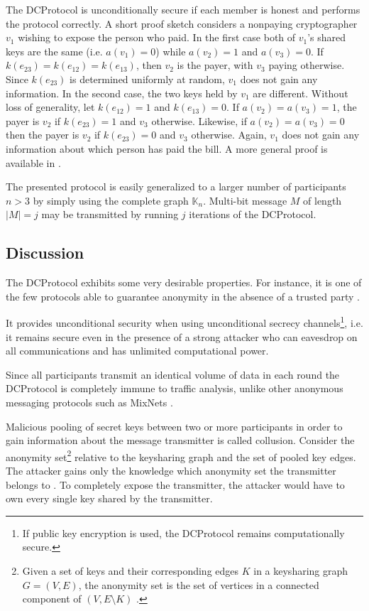 The \ac{DCProtocol} is unconditionally secure if each member is honest and performs the
protocol correctly. A short proof sketch considers a nonpaying cryptographer $v_1$
wishing to expose the person who paid. In the first case both of $v_1$'s shared keys are the same
(i.e. $a(v_1) = 0$) while $a(v_2) = 1$ and $a(v_3) = 0$. If $k(e_{23}) = k(e_{12}) = k(e_{13})$, then $v_2$
is the payer, with $v_3$ paying otherwise. Since $k(e_{23})$ is determined uniformly at random,
$v_1$ does not gain any information. In the second case, the two keys held by $v_1$ are different.
Without loss of generality, let $k(e_{12}) = 1$ and $k(e_{13}) = 0$.
If $a(v_2) = a(v_3) = 1$, the payer is $v_2$ if $k(e_{23}) = 1$ and $v_3$ otherwise.
Likewise, if $a(v_2) = a(v_3) = 0$ then the payer is $v_2$ if $k(e_{23}) = 0$ and $v_3$ otherwise.
Again, $v_1$ does not gain any information about which person has paid the bill.
A more general proof is available in \cite{journals/joc/Chaum88}.

The presented protocol is easily generalized to a larger number of participants $n > 3$ by simply
using the complete graph $\mathbb{K}_n$. Multi-bit message $M$ of length $|M| = j$
may be transmitted by running $j$ iterations of the \ac{DCProtocol}.  


\subsection{Discussion}

The \ac{DCProtocol} exhibits some very desirable properties. For instance, it is one of the few
protocols able to guarantee anonymity in the absence of a trusted party \cite{juels2004dining}.

It provides unconditional security when using unconditional secrecy channels\footnote{
If public key encryption is used, the \ac{DCProtocol} remains computationally secure.},
i.e. it remains secure even in the presence of a
strong attacker who can eavesdrop on all communications and has unlimited computational power.

Since all participants transmit an identical volume of data in each round the \ac{DCProtocol}
is completely immune to traffic analysis, unlike other anonymous messaging protocols such
as \acp{MixNet} \cite{journals/cacm/Chaum81}.

Malicious pooling of secret keys between two or more participants in order to
gain information about the message transmitter is called collusion.
Consider the anonymity set\footnote{Given a set of keys and their corresponding edges $K$ in a keysharing graph $G = (V, E)$, the anonymity set is the set of vertices in a connected component of $(V, E \setminus K)$ \cite{journals/joc/Chaum88}.}
relative to the keysharing graph and the set of pooled key edges.
The attacker gains only the knowledge which anonymity set the transmitter belongs to \cite{journals/joc/Chaum88}. To completely expose the transmitter, the attacker would
have to own every single key shared by the transmitter.

